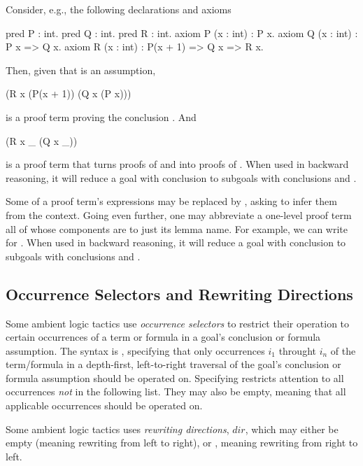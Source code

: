 Consider, e.g., the following declarations and axioms
\begin{easycrypt}{}{}
pred P : int.
pred Q : int.
pred R : int.
axiom P (x : int) : P x.
axiom Q (x : int) : P x => Q x.
axiom R (x : int) : P(x + 1) => Q x => R x.
\end{easycrypt}
Then, given that  is an assumption,
\begin{easycrypt}{}{}
(R x (P(x + 1)) (Q x (P x)))
\end{easycrypt}
is a proof term proving the conclusion . And
\begin{easycrypt}{}{}
(R x _ (Q x _))
\end{easycrypt}
is a proof term that turns proofs of  and 
into proofs of . When used in backward reasoning, it
will reduce a goal with conclusion  to subgoals with
conclusions  and .

Some of a proof term's expressions may be replaced by \ec{_}, asking
\EasyCrypt to infer them from the context.  Going even further, one
may abbreviate a one-level proof term all of whose components are
\ec{_} to just its lemma name. For example, we can write  for
.  When used in backward reasoning, it will reduce a
goal with conclusion  to subgoals with conclusions  and . 

\subsection{Occurrence Selectors and Rewriting Directions}
\label{subsec:occsels}

Some ambient logic tactics use \emph{occurrence selectors} to restrict
their operation to certain occurrences of a term or formula in a
goal's conclusion or formula assumption. The syntax is , specifying that only occurrences $i_1$
throught $i_n$ of the term/formula in a depth-first, left-to-right
traversal of the goal's conclusion or formula assumption should be
operated on. Specifying 
restricts attention to all occurrences \emph{not} in the following
list. They may also be empty, meaning that all applicable occurrences
should be operated on.

Some ambient logic tactics uses \emph{rewriting directions}, $\mathit{dir}$,
which may either be empty (meaning rewriting from left to right), or \ec{-},
meaning rewriting from right to left.

